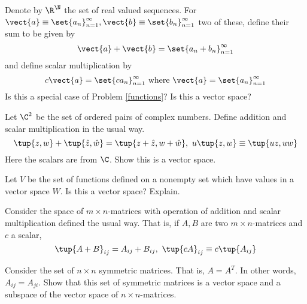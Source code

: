 \begin{enumialphparenastyle}
\begin{ex} Denote by $\R^{\N}$ the set of real valued sequences.
For $\vect{a}\equiv \set{a_{n}} _{n=1}^{\infty },\vect{b}\equiv
\set{b_{n}} _{n=1}^{\infty }$ two of these, define their sum to be
given by 
\begin{equation*}
\vect{a}+\vect{b} =  \set{a_{n}+b_{n}} _{n=1}^{\infty }
\end{equation*}
and define scalar multiplication by 
\begin{equation*}
c\vect{a}=\set{ca_{n}} _{n=1}^{\infty }\text{ where }\vect{a}
=\set{a_{n}} _{n=1}^{\infty }
\end{equation*}
Is this a special case of Problem \ref{functions}? Is this a vector space?
\end{ex}

\begin{ex} Let $\C^{2}$ be the set of ordered pairs of complex numbers.
Define addition and scalar multiplication in the usual way.
\begin{equation*}
\tup{z,w} +\tup{\hat{z},\hat{w}} = \tup{z+\hat{z},w+
\hat{w}} ,\ u\tup{z,w} \equiv \tup{uz,uw}
\end{equation*}
Here the scalars are from $\C$. Show this is a vector space.
\end{ex}

\begin{ex} Let $V$ be the set of functions defined on a nonempty set which have
values in a vector space $W$. Is this a vector space? Explain.
\end{ex}

\begin{ex} Consider the space of $m\times n$-matrices with operation of addition
and scalar multiplication defined the usual way. That is, if $A,B$ are two $
m\times n$-matrices and $c$ a scalar, 
\begin{equation*}
\tup{A+B} _{ij}=A_{ij}+B_{ij},\ \tup{cA} _{ij}\equiv c\tup{
A_{ij}}
\end{equation*}
\end{ex}

\begin{ex} Consider the set of $n\times n$ symmetric matrices. That is, $A=A^{T}$.
In other words, $A_{ij}=A_{ji}$. Show that this set of symmetric matrices is
a vector space and a subspace of the vector space of $n\times n$-matrices.
\end{ex}


\end{enumialphparenastyle}
